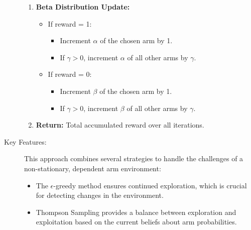 \documentclass[11pt]{article}
\begin{document}
\begin{description}
\begin{enumerate}
    \item \textbf{Beta Distribution Update:} 
    \begin{itemize}
        \item If reward = 1:
        \begin{itemize}
            \item Increment $\alpha$ of the chosen arm by 1.
            \item If $\gamma > 0$, increment $\alpha$ of all other arms by $\gamma$.
        \end{itemize}
        \item If reward = 0:
        \begin{itemize}
            \item Increment $\beta$ of the chosen arm by 1.
            \item If $\gamma > 0$, increment $\beta$ of all other arms by $\gamma$.
        \end{itemize}
    \end{itemize}
    
    \item \textbf{Return:} Total accumulated reward over all iterations.
\end{enumerate}


\item[Key Features:] This approach combines several strategies to handle the challenges of a non-stationary, dependent arm environment:

\begin{itemize}
    \item The $\epsilon$-greedy method ensures continued exploration, which is crucial for detecting changes in the environment.
    \item Thompson Sampling provides a balance between exploration and exploitation based on the current beliefs about arm probabilities.
\end{itemize}

\end{description}
\end{document}
